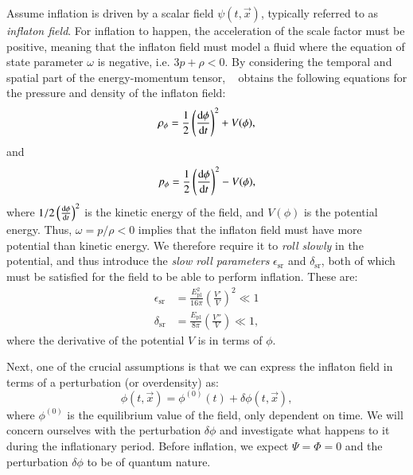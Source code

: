     Assume inflation is driven by a scalar field $\psi(t,\vec{x})$, typically referred to as \textit{inflaton field}. For inflation to happen, the acceleration of the scale factor must be positive, meaning that the inflaton field must model a fluid where the equation of state parameter $\omega$ is negative, i.e. $3p+\rho<0$. By considering the temporal and spatial part of the energy-momentum tensor, ~\cite{dodelson2020modern} obtains the following equations for the pressure and density of the inflaton field:
    \begin{equation}\label{eq:m3:theory:inflaton_density}
        \rho_\phi = \frac{1}{2}\left(\dv{\phi}{t}\right)^2+V(\phi),
    \end{equation}
    and 
    \begin{equation}\label{eq:m3:theory:inflaton_pressure}
        p_\phi = \frac{1}{2}\left(\dv{\phi}{t}\right)^2-V(\phi),
    \end{equation}
    where $1/2\left(\dv{\phi}{t}\right)^2$ is the kinetic energy of the field, and $V(\phi)$ is the potential energy. Thus, $\omega = p/\rho < 0$ implies that the inflaton field must have more potential than kinetic energy. We therefore require it to \textit{roll slowly} in the potential, and thus introduce the \textit{slow roll parameters} $\epsilon_\mathrm{sr}$ and $\delta_\mathrm{sr}$, both of which must be satisfied for the field to be able to perform inflation. These are:
    \begin{subequations}\label{eq:m3:theory:slow_roll_parameters}
        \begin{align}
            \epsilon_\mathrm{sr} &= \frac{E_\mathrm{pl}^2}{16\pi}\left(\frac{V'}{V}\right)^2 \ll1 \label{eq:m3:theory:slow_roll_epsilon}\\
            \delta_\mathrm{sr} &= \frac{E_\mathrm{pl}}{8\pi}\left( \frac{V''}{V}\right) \ll1,\label{eq:m3:theory:slow_roll_delta}
        \end{align}
    \end{subequations}
    where the derivative of the potential $V$ is in terms of $\phi$. 

    Next, one of the crucial assumptions is that we can express the inflaton field in terms of a perturbation (or overdensity) as:
    \begin{equation}\label{eq:m3:theory:inflaton_field_perturb}
        \phi(t,\vec{x}) = \phi^{(0)}(t) + \delta\phi(t, \vec{x}),
    \end{equation}
    where $\phi^{(0)}$ is the equilibrium value of the field, only dependent on time. We will concern ourselves with the perturbation $\delta\phi$ and investigate what happens to it during the inflationary period. Before inflation, we expect $\Psi = \Phi =0$ and the perturbation $\delta\phi$ to be of quantum nature. 

